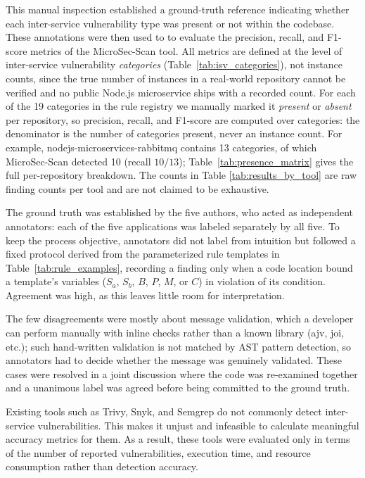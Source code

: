 \documentclass[preprint,12pt]{elsarticle}
\newcommand{\new}[1]{#1}
\begin{document}
This manual inspection established a ground-truth reference indicating whether each inter-service vulnerability type was present or not within the codebase. These annotations were then used to to evaluate the precision, recall, and F1-score metrics of the MicroSec-Scan tool. \new{All metrics are defined at the level of inter-service vulnerability \emph{categories} (Table~\ref{tab:isv_categories}), not instance counts, since the true number of instances in a real-world repository cannot be verified and no public Node.js microservice ships with a recorded count. For each of the 19 categories in the rule registry we manually marked it \emph{present} or \emph{absent} per repository, so precision, recall, and F1-score are computed over categories: the denominator is the number of categories present, never an instance count. For example, nodejs-microservices-rabbitmq contains 13 categories, of which MicroSec-Scan detected 10 (recall $10/13$); Table~\ref{tab:presence_matrix} gives the full per-repository breakdown. The counts in Table \ref{tab:results_by_tool} are raw finding counts per tool and are not claimed to be exhaustive.}

\new{The ground truth was established by the five authors, who acted as independent annotators: each of the five applications was labeled separately by all five. To keep the process objective, annotators did not label from intuition but followed a fixed protocol derived from the parameterized rule templates in Table~\ref{tab:rule_examples}, recording a finding only when a code location bound a template's variables ($S_a$, $S_b$, $B$, $P$, $M$, or $C$) in violation of its condition. Agreement was high, as this leaves little room for interpretation.}

\new{The few disagreements were mostly about message validation, which a developer can perform manually with inline checks rather than a known library (ajv, joi, etc.); such hand-written validation is not matched by AST pattern detection, so annotators had to decide whether the message was genuinely validated. These cases were resolved in a joint discussion where the code was re-examined together and a unanimous label was agreed before being committed to the ground truth.}



Existing tools such as Trivy, Snyk, and Semgrep do not commonly detect inter-service vulnerabilities. This makes it unjust and infeasible to calculate meaningful accuracy metrics for them. As a result, these tools were evaluated only in terms of the number of reported vulnerabilities, execution time, and resource consumption rather than detection accuracy.
\end{document}
